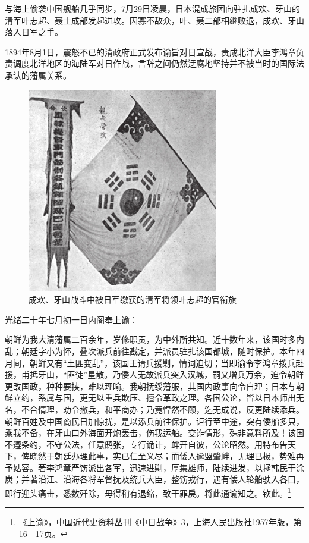 \documentclass[12pt,UTF8]{ctexbook}
\begin{document}
与海上偷袭中国舰船几乎同步，7月29日凌晨，日本混成旅团向驻扎成欢、牙山的清军叶志超、聂士成部发起进攻。因寡不敌众，叶、聂二部相继败退，成欢、牙山落入日军之手。

1894年8月1日，震怒不已的清政府正式发布谕旨对日宣战，责成北洋大臣李鸿章负责调度北洋地区的海陆军对日作战，言辞之间仍然迂腐地坚持并不被当时的国际法承认的藩属关系。

\begin{figure}[htbp]
	\centering
	\includegraphics[width=0.7\linewidth]{10}
	\caption{成欢、牙山战斗中被日军缴获的清军将领叶志超的官衔旗}
	\label{fig:1}
\end{figure}

光绪二十年七月初一日内阁奉上谕：

朝鲜为我大清藩属二百余年，岁修职贡，为中外所共知。近十数年来，该国时多内乱；朝廷字小为怀，叠次派兵前往戡定，并派员驻扎该国都城，随时保护。本年四月间，朝鲜又有“土匪变乱”，该国王请兵援剿，情词迫切；当即谕令李鸿章拨兵赴援，甫抵牙山，“匪徒”星散。乃倭人无故派兵突入汉城，嗣又增兵万余，迫令朝鲜更改国政，种种要挟，难以理喻。我朝抚绥藩服，其国内政事向令自理；日本与朝鲜立约，系属与国，更无以重兵欺压、擅令革政之理。各国公论，皆以日本师出无名，不合情理，劝令撤兵，和平商办；乃竟悍然不顾，迄无成说，反更陆续添兵。朝鲜百姓及中国商民日加惊扰，是以添兵前往保护。讵行至中途，突有倭船多只，乘我不备，在牙山口外海面开炮轰击，伤我运船。变诈情形，殊非意料所及！该国不遵条约，不守公法，任意鸱张，专行诡计，衅开自彼，公论昭然。用特布告天下，俾晓然于朝廷办理此事，实已仁至义尽；而倭人逾盟肇衅，无理已极，势难再予姑容。著李鸿章严饬派出各军，迅速进剿，厚集雄师，陆续进发，以拯韩民于涂炭；并著沿江、沿海各将军督抚及统兵大臣，整饬戎行，遇有倭人轮船驶入各口，即行迎头痛击，悉数歼除，毋得稍有退缩，致干罪戾。将此通谕知之。钦此。\footnote{《上谕》，中国近代史资料丛刊《中日战争》3，上海人民出版社1957年版，第16—17页。}
\end{document}
